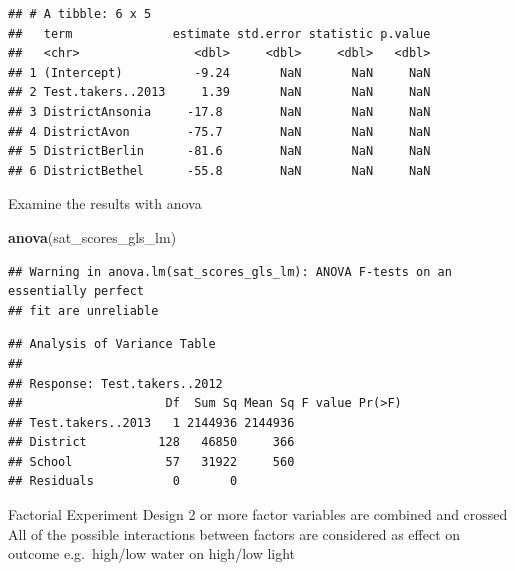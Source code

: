 \documentclass[]{book}
\newenvironment{Shaded}{\begin{snugshade}}{\end{snugshade}}
\newcommand{\CommentTok}[1]{\textcolor[rgb]{0.56,0.35,0.01}{\textit{#1}}}
\newcommand{\DataTypeTok}[1]{\textcolor[rgb]{0.13,0.29,0.53}{#1}}
\newcommand{\DecValTok}[1]{\textcolor[rgb]{0.00,0.00,0.81}{#1}}
\newcommand{\KeywordTok}[1]{\textcolor[rgb]{0.13,0.29,0.53}{\textbf{#1}}}
\newcommand{\NormalTok}[1]{#1}
\newcommand{\OperatorTok}[1]{\textcolor[rgb]{0.81,0.36,0.00}{\textbf{#1}}}
\newcommand{\StringTok}[1]{\textcolor[rgb]{0.31,0.60,0.02}{#1}}
\begin{document}
\begin{Shaded}
\end{Shaded}

\begin{verbatim}
## # A tibble: 6 x 5
##   term              estimate std.error statistic p.value
##   <chr>                <dbl>     <dbl>     <dbl>   <dbl>
## 1 (Intercept)          -9.24       NaN       NaN     NaN
## 2 Test.takers..2013     1.39       NaN       NaN     NaN
## 3 DistrictAnsonia     -17.8        NaN       NaN     NaN
## 4 DistrictAvon        -75.7        NaN       NaN     NaN
## 5 DistrictBerlin      -81.6        NaN       NaN     NaN
## 6 DistrictBethel      -55.8        NaN       NaN     NaN
\end{verbatim}

Examine the results with anova

\begin{Shaded}
\begin{Highlighting}[]
\KeywordTok{anova}\NormalTok{(sat_scores_gls_lm)}
\end{Highlighting}
\end{Shaded}

\begin{verbatim}
## Warning in anova.lm(sat_scores_gls_lm): ANOVA F-tests on an essentially perfect
## fit are unreliable
\end{verbatim}

\begin{verbatim}
## Analysis of Variance Table
## 
## Response: Test.takers..2012
##                    Df  Sum Sq Mean Sq F value Pr(>F)
## Test.takers..2013   1 2144936 2144936               
## District          128   46850     366               
## School             57   31922     560               
## Residuals           0       0
\end{verbatim}

Factorial Experiment Design
2 or more factor variables are combined and crossed
All of the possible interactions between factors are considered as effect on outcome
e.g.~high/low water on high/low light
\end{document}
